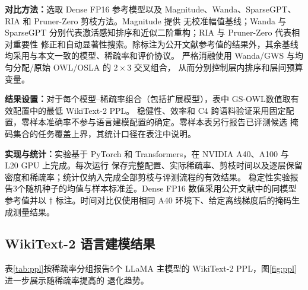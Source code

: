 \documentclass[UTF8,fontset=fandol]{ctexart}
\newcommand{\method}{GS-OWL}
\begin{document}
\textbf{对比方法：}选取 Dense FP16 参考模型以及 Magnitude、Wanda、SparseGPT、RIA 和 Pruner-Zero 剪枝方法。Magnitude 提供
无校准幅值基线；Wanda 与 SparseGPT 分别代表激活感知排序和近似二阶重构；RIA 与 Pruner-Zero 代表相对重要性
修正和自动显著性搜索。除标注为公开文献参考值的结果外，其余基线均采用与本文一致的模型、稀疏率和评价协议。
严格消融使用 Wanda/GWS 与均匀分配/原始 OWL/OSLA 的 $2\times3$ 交叉组合，
从而分别控制层内排序和层间预算变量。

\textbf{结果设置：}对于每个模型--稀疏率组合（包括扩展模型），表中 \method 数值取有效配置中的最低 WikiText-2 PPL。
稳健性、效率和 C4 跨语料验证采用固定配置，零样本准确率不参与语言建模配置的确定。零样本表另行报告已评测候选
掩码集合的任务覆盖上界，其统计口径在表注中说明。

\textbf{实现与统计：}实验基于 PyTorch 和 Transformers，在 NVIDIA A40、A100 与 L20 GPU 上完成。每次运行
保存完整配置、实际稀疏率、剪枝时间以及逐层保留密度和稀疏率；统计仅纳入完成全部剪枝与评测流程的有效结果。
稳定性实验报告3个随机种子的均值与样本标准差。Dense FP16 数值采用公开文献中的同模型参考值并以
$\dagger$ 标注。时间对比仅使用相同 A40 环境下、给定离线梯度后的掩码生成测量结果。

\subsection{WikiText-2 语言建模结果}

表\ref{tab:ppl}按稀疏率分组报告5个 LLaMA 主模型的 WikiText-2 PPL，图\ref{fig:ppl}进一步展示随稀疏率提高的
退化趋势。
\end{document}
